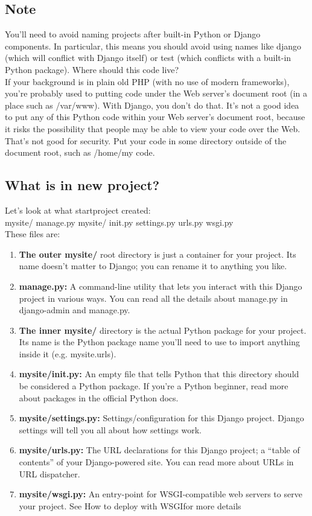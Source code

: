 \documentclass[11pt]{article}
\begin{document}
\begin{multicols}{2}
\subsection{Note}
You'll need to avoid naming projects after built-in Python or Django components. In particular, this means you should avoid using names like django (which will conflict with Django itself) or test (which conflicts with a built-in Python package).
Where should this code live?
\\If your background is in plain old PHP (with no use of modern frameworks), you're probably used to putting code under the Web server's document root (in a place such as /var/www). With Django, you don't do that. It's not a good idea to put any of this Python code within your Web server's document root, because it risks the possibility that people may be able to view your code over the Web. That's not good for security.
Put your code in some directory outside of the document root, such as /home/my code.
\subsection{What is in new project?}
Let’s look at what startproject created:
\\mysite/
    manage.py
    mysite/
        init.py
        settings.py
        urls.py
        wsgi.py
\\These files are:
\begin{enumerate}

\item \textbf{The outer mysite/} root directory is just a container for your project. Its name doesn’t matter to Django; you can rename it to anything you like.
\item \textbf{manage.py:} A command-line utility that lets you interact with this Django project in various ways. You can read all the details about manage.py in django-admin and manage.py.
\item \textbf{The inner mysite/} directory is the actual Python package for your project. Its name is the Python package name you’ll need to use to import anything inside it (e.g. mysite.urls).
\item	\textbf{mysite/init.py:} An empty file that tells Python that this directory should be considered a Python package. If you’re a Python beginner, read more about packages in the official Python docs.
\item	\textbf{mysite/settings.py:} Settings/configuration for this Django project. Django settings will tell you all about how settings work.
\item	\textbf{mysite/urls.py:} The URL declarations for this Django project; a “table of contents” of your Django-powered site. You can read more about URLs in URL dispatcher.
\item	\textbf{mysite/wsgi.py:} An entry-point for WSGI-compatible web servers to serve your project. See How to deploy with WSGIfor more details
\end{enumerate}

\end{multicols}
\end{document}
